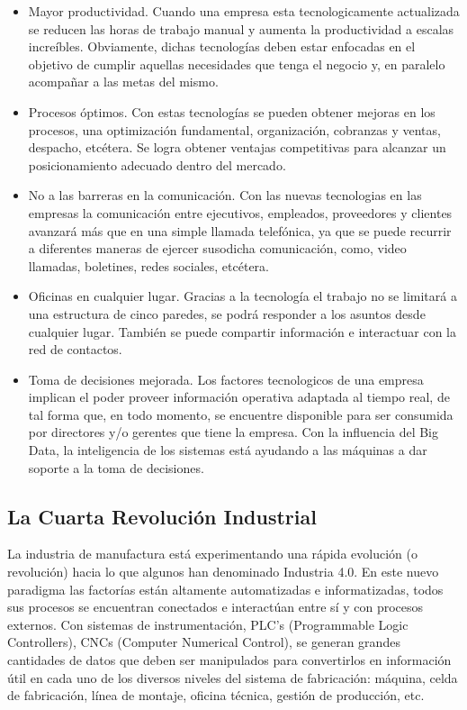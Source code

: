 \documentclass[runningheads,a4paper,12pt]{report}
\begin{document}
\begin{itemize}
	\item Mayor productividad. Cuando una empresa esta tecnologicamente actualizada se reducen las horas de trabajo manual y aumenta la productividad a escalas increíbles. Obviamente, dichas tecnologías deben estar enfocadas en el objetivo de cumplir aquellas necesidades que tenga el negocio y, en paralelo acompañar a las metas del mismo. \\
	\item Procesos óptimos. Con estas tecnologías se pueden obtener mejoras en los procesos,  una optimización fundamental, organización, cobranzas y ventas, despacho, etcétera. Se logra obtener ventajas competitivas para alcanzar un posicionamiento adecuado dentro del mercado. \\
	\item No a las barreras en la comunicación. Con las nuevas tecnologias en las empresas la comunicación entre ejecutivos, empleados, proveedores y clientes avanzará más que en una simple llamada telefónica, ya que se puede recurrir a diferentes maneras de ejercer susodicha comunicación, como, video llamadas, boletines, redes sociales, etcétera. \\
	\item Oficinas en cualquier lugar. Gracias a la tecnología el trabajo no se limitará a una estructura de cinco paredes, se podrá responder a los asuntos desde cualquier lugar. También se puede compartir información e interactuar con la red de contactos. \\
	\item Toma de decisiones mejorada. Los factores tecnologicos de una empresa implican el poder proveer información operativa adaptada al tiempo real, de tal forma que, en todo momento, se encuentre disponible para ser consumida por directores y/o gerentes que tiene la empresa. Con la influencia del Big Data, la inteligencia de los sistemas está ayudando a las máquinas a dar soporte a la toma de decisiones.\\
	
\end{itemize}

\subsection{La Cuarta Revolución Industrial}

La industria de manufactura está experimentando una rápida evolución (o revolución) hacia lo que algunos han denominado Industria 4.0. En este nuevo paradigma las factorías están altamente automatizadas e informatizadas, todos sus procesos se encuentran conectados e interactúan entre sí y con procesos externos. Con sistemas de instrumentación, PLC's (Programmable Logic Controllers), CNCs (Computer Numerical Control), se generan grandes cantidades de datos que deben ser manipulados para convertirlos en información útil en cada uno de los diversos niveles del sistema de fabricación: máquina, celda de fabricación, línea de montaje, oficina técnica, gestión de producción, etc. \\
\end{document}
